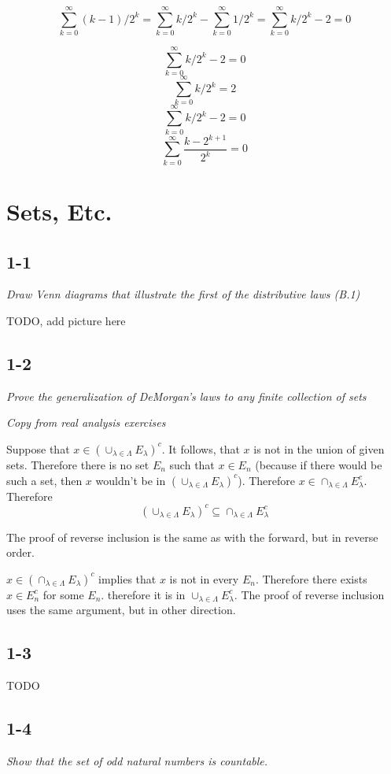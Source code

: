 \documentclass[11pt,oneside,titlepage]{book}
\begin{document}
$$\sum_{k = 0}^{\infty}{(k - 1)/2^k} = \sum_{k = 0}^{\infty}{k/2^k} - \sum_{k = 0}^{\infty}{1/2^k} =
\sum_{k = 0}^{\infty}{k/2^k} - 2 = 0$$

$$\sum_{k = 0}^{\infty}{k/2^k} - 2 = 0$$
$$\sum_{k = 0}^{\infty}{k/2^k} = 2$$
$$\sum_{k = 0}^{\infty}{k/2^k - 2} = 0$$
$$\sum_{k = 0}^{\infty}{\frac{k - 2^{k + 1}}{2^k}} = 0$$


\chapter{Sets, Etc.}

\section*{1-1}
\textit{Draw Venn diagrams that illustrate the first of the distributive laws
(B.1)}

TODO, add picture here

\section*{1-2}
\textit{Prove the generalization of DeMorgan's laws to any finite collection
  of sets}

\textit{Copy from real analysis exercises}

Suppose that $x \in \left(\cup_{\lambda \in \Lambda} E_\lambda \right)^c$. It
follows, that $x$ is not in the union of given sets. Therefore there is no
set $E_n$ such that $x \in E_n$ (because if there would be such a set, then $x$
wouldn't be in $\left(\cup_{\lambda \in \Lambda} E_\lambda \right)^c$).
Therefore $x \in \cap_{\lambda \in \Lambda} E_\lambda^c$. Therefore 
$$\left(\cup_{\lambda \in \Lambda} E_\lambda \right)^c \subseteq
\cap_{\lambda \in \Lambda} E_\lambda^c$$

The proof of reverse inclusion is the same as with the forward, but in reverse
order.

$x \in \left(\cap_{\lambda \in \Lambda} E_\lambda \right)^c$ implies that
$x$ is not in every $E_n$. Therefore there exists $x \in E_n^c$ for some $E_n$.
therefore it is in $\cup_{\lambda \in \Lambda} E_\lambda^c$. The proof of
reverse inclusion uses the same argument, but in other direction.

\section*{1-3}
TODO

\section*{1-4}
\textit{Show that the set of odd natural numbers is countable.}
\end{document}

